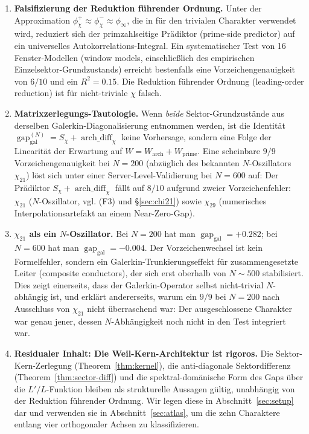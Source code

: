 \documentclass[10pt,twocolumn]{article}
\theoremstyle{definition}
\theoremstyle{remark}
\newcommand{\gap}{\operatorname{gap}}
\newcommand{\chifn}{\chi}
\newcommand{\archdiff}{\operatorname{arch\_diff}}
\begin{document}
\begin{enumerate}
\item[(F1)] \textbf{Falsifizierung der Reduktion führender Ordnung.}
  Unter der Approximation
  $\phi^+_{\chifn}\approx\phi^-_{\chifn}\approx\phi_\infty$, die in
  \cite{RH_II} für den trivialen Charakter verwendet wird, reduziert sich der primzahlseitige
  Prädiktor (prime-side predictor) auf ein universelles Autokorrelations-Integral. Ein systematischer Test
  von 16 Fenster-Modellen (window models, einschließlich des empirischen Einzelsektor-Grundzustands)
  erreicht bestenfalls eine Vorzeichengenauigkeit von $6/10$ und ein $R^2=0.15$.
  Die Reduktion führender Ordnung (leading-order reduction) ist für nicht-triviale $\chi$ falsch.
\item[(F2)] \textbf{Matrixzerlegungs-Tautologie.}
  Wenn \emph{beide} Sektor-Grundzustände aus derselben
  Galerkin-Diagonalisierung entnommen werden, ist die Identität
  $\gap_{\mathrm{gal}}^{(N)} = S_{\chifn}+\archdiff_{\chifn}$
  keine Vorhersage, sondern eine Folge der Linearität der
  Erwartung auf $W=W_{\mathrm{arch}}+W_{\mathrm{prime}}$. Eine scheinbare
  $9/9$ Vorzeichengenauigkeit bei $N=200$ (abzüglich des bekannten $N$-Oszillators
  $\chi_{21}$) löst sich unter einer Server-Level-Validierung bei $N=600$ auf: Der
  Prädiktor $S_{\chifn}+\archdiff_{\chifn}$ fällt auf $8/10$ aufgrund
  zweier Vorzeichenfehler: $\chi_{21}$ ($N$-Oszillator,
  vgl. (F3) und \S\ref{sec:chi21}) sowie $\chi_{29}$ (numerisches
  Interpolationsartefakt an einem Near-Zero-Gap).
\item[(F3)] \textbf{$\chi_{21}$ als ein $N$-Oszillator.}
  Bei $N=200$ hat man $\gap_{\mathrm{gal}}=+0.282$; bei $N=600$ hat man
  $\gap_{\mathrm{gal}}=-0.004$. Der Vorzeichenwechsel ist kein Formelfehler,
  sondern ein Galerkin-Trunkierungseffekt für zusammengesetzte Leiter (composite conductors), der sich erst
  oberhalb von $N\sim 500$ stabilisiert. Dies zeigt einerseits, dass der Galerkin-Operator
  selbst nicht-trivial $N$-abhängig ist, und erklärt andererseits, warum ein
  $9/9$ bei $N=200$ nach Ausschluss von $\chi_{21}$ nicht überraschend war:
  Der ausgeschlossene Charakter war genau jener, dessen $N$-Abhängigkeit noch nicht
  in den Test integriert war.
\item[(F4)] \textbf{Residualer Inhalt: Die Weil-Kern-Architektur ist
  rigoros.} Die Sektor-Kern-Zerlegung
  (Theorem~\ref{thm:kernel}), die anti-diagonale Sektordifferenz
  (Theorem~\ref{thm:sector-diff}) und die spektral-domänische Form des
  Gaps über die $L'/L$-Funktion bleiben als strukturelle Aussagen gültig,
  unabhängig von der Reduktion führender Ordnung. Wir legen diese in
  Abschnitt~\ref{sec:setup} dar und verwenden sie in Abschnitt~\ref{sec:atlas},
  um die zehn Charaktere entlang vier orthogonaler Achsen zu klassifizieren.
\end{enumerate}
\end{document}
